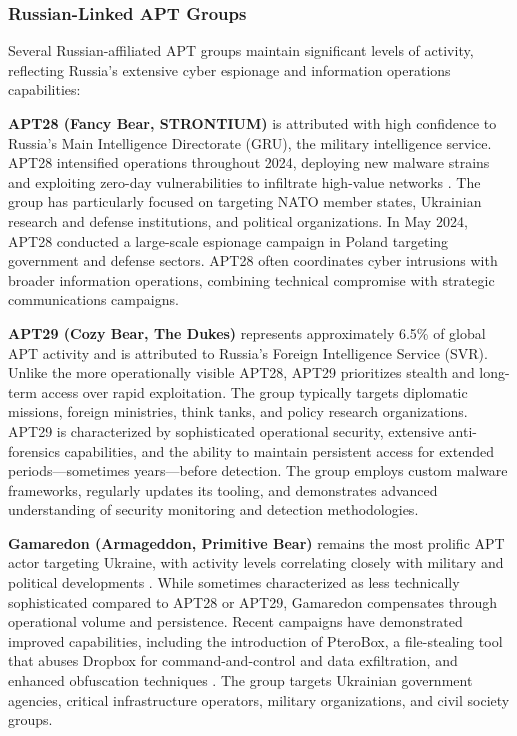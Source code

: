 \subsubsection{Russian-Linked APT Groups}

Several Russian-affiliated APT groups maintain significant levels of activity, reflecting Russia's extensive cyber espionage and information operations capabilities:

\textbf{APT28 (Fancy Bear, STRONTIUM)} is attributed with high confidence to Russia's Main Intelligence Directorate (GRU), the military intelligence service. APT28 intensified operations throughout 2024, deploying new malware strains and exploiting zero-day vulnerabilities to infiltrate high-value networks \cite{socradar2024}. The group has particularly focused on targeting NATO member states, Ukrainian research and defense institutions, and political organizations. In May 2024, APT28 conducted a large-scale espionage campaign in Poland targeting government and defense sectors. APT28 often coordinates cyber intrusions with broader information operations, combining technical compromise with strategic communications campaigns.

\textbf{APT29 (Cozy Bear, The Dukes)} represents approximately 6.5\% of global APT activity \cite{trellix2025} and is attributed to Russia's Foreign Intelligence Service (SVR). Unlike the more operationally visible APT28, APT29 prioritizes stealth and long-term access over rapid exploitation. The group typically targets diplomatic missions, foreign ministries, think tanks, and policy research organizations. APT29 is characterized by sophisticated operational security, extensive anti-forensics capabilities, and the ability to maintain persistent access for extended periods---sometimes years---before detection. The group employs custom malware frameworks, regularly updates its tooling, and demonstrates advanced understanding of security monitoring and detection methodologies.

\textbf{Gamaredon (Armageddon, Primitive Bear)} remains the most prolific APT actor targeting Ukraine, with activity levels correlating closely with military and political developments \cite{eset2025q2q3}. While sometimes characterized as less technically sophisticated compared to APT28 or APT29, Gamaredon compensates through operational volume and persistence. Recent campaigns have demonstrated improved capabilities, including the introduction of PteroBox, a file-stealing tool that abuses Dropbox for command-and-control and data exfiltration, and enhanced obfuscation techniques \cite{eset2025q2q3}. The group targets Ukrainian government agencies, critical infrastructure operators, military organizations, and civil society groups.

